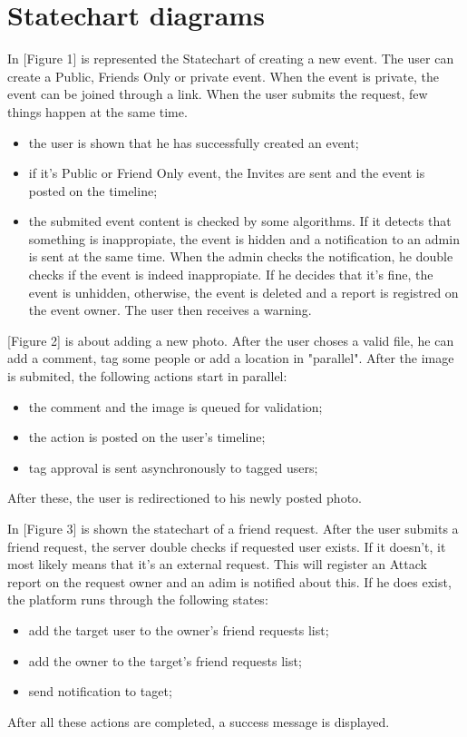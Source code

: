 \documentclass{article}
\begin{document}
	\section{Statechart diagrams}
		In [Figure 1] is represented the Statechart of creating a new event. The user can create a Public, Friends Only or private event. When the event is private, the event can be joined through a link. When the user submits the request, few things happen at the same time.
			\begin{itemize}
				\item the user is shown that he has successfully created an event;
				\item if it's Public or Friend Only event, the Invites are sent and the event is posted on the timeline;
				\item the submited event content is checked by some algorithms. If it detects that something is inappropiate, the event is hidden and a notification to an admin is sent at the same time. When the admin checks the notification, he double checks if the event is indeed inappropiate. If he decides that it's fine, the event is unhidden, otherwise, the event is deleted and a report is registred on the event owner. The user then receives a warning.
			\end{itemize}

		\bigskip
		[Figure 2] is about adding a new photo. After the user choses a valid file, he can add a comment, tag some people or add a location in "parallel". After the image is submited, the following actions start in parallel:
		\begin{itemize}
			\item the comment and the image is queued for validation;
			\item the action is posted on the user's timeline;
			\item tag approval is sent asynchronously to tagged users;
		\end{itemize}
		After these, the user is redirectioned to his newly posted photo.
		
		\bigskip
		In [Figure 3] is shown the statechart of a friend request. After the user submits a friend request, the server double checks if requested user exists. If it doesn't, it most likely means that it's an external request. This will register an Attack report on the request owner and an adim is notified about this. If he does exist, the platform runs through the following states:
		\begin{itemize}
			\item add the target user to the owner's friend requests list;
			\item add the owner to the target's friend requests list;
			\item send notification to taget;
		\end{itemize}
		After all these actions are completed, a success message is displayed.
\end{document}
